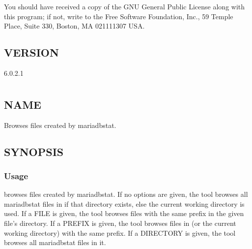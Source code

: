 \documentclass[letterpaper,10pt,english]{sphinxmanual}
\begin{document}
You should have received a copy of the GNU General Public License along with
this program; if not, write to the Free Software Foundation, Inc., 59 Temple
Place, Suite 330, Boston, MA  02111\sphinxhyphen{}1307  USA.


\section{VERSION}
\label{\detokenize{mariadb-stat:version}}
 6.0.2.1


\chapter{}
\label{\detokenize{mariadb-stat-browser:mariadb-stat-browser}}\label{\detokenize{mariadb-stat-browser::doc}}

\section{NAME}
\label{\detokenize{mariadb-stat-browser:name}}
 \sphinxhyphen{} Browses files created by mariadb\sphinxhyphen{}stat.


\section{SYNOPSIS}
\label{\detokenize{mariadb-stat-browser:synopsis}}

\subsection{Usage}
\label{\detokenize{mariadb-stat-browser:usage}}
\begin{sphinxVerbatim}[commandchars=\\\{\}]
 
\end{sphinxVerbatim}

 browses files created by mariadb\sphinxhyphen{}stat.  If no options are given,
the tool browses all mariadb\sphinxhyphen{}stat files in  if that directory
exists, else the current working directory is used.  If a FILE is given,
the tool browses files with the same prefix in the given file’s directory.
If a PREFIX is given, the tool browses files in 
(or the current working directory) with the same prefix.  If a DIRECTORY
is given, the tool browses all mariadb\sphinxhyphen{}stat files in it.
\end{document}
